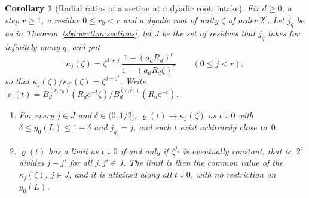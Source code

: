 \documentclass[11pt,a4paper]{article}
\newtheorem{corollary}[theorem]{Corollary}
\theoremstyle{definition}
\newcommand{\e}{\mathrm e}
\begin{document}
\begin{corollary}[Radial ratios of a section at a dyadic root; intake]
\label{sbd:wr:cor:ratio}
Fix $d\ge0$, a step $r\ge1$, a residue $0\le r_0<r$ and a dyadic root of
unity $\zeta$ of order $2^e$. Let $j_q$ be as in
Theorem~\ref{sbd:wr:thm:sections}, let $J$ be the set of residues that
$j_q$ takes for infinitely many $q$, and put
\[
 \kappa_j(\zeta)=\zeta^{1+j}\,\frac{1-(a_dR_d)^r}{1-(a_dR_d\zeta)^r}
 \qquad(0\le j<r),
\]
so that $\kappa_j(\zeta)/\kappa_{j'}(\zeta)=\zeta^{j-j'}$. Write
$\varrho(t)=B_d^{(r,r_0)}(R_d\e^{-t}\zeta)/B_d^{(r,r_0)}(R_d\e^{-t})$.
\begin{enumerate}[label=(\roman*)]
\item For every $j\in J$ and $\delta\in(0,1/2]$, $\varrho(t)\to\kappa_j(\zeta)$
as $t\downarrow0$ with $\delta\le y_0(L)\le1-\delta$ and $j_{q_t}=j$, and
such $t$ exist arbitrarily close to~$0$.
\item $\varrho(t)$ has a limit as $t\downarrow0$ if and only if
$\zeta^{j_q}$ is eventually constant, that is, $2^e$ divides $j-j'$ for all
$j,j'\in J$. The limit is then the common value of the $\kappa_j(\zeta)$,
$j\in J$, and it is attained along all $t\downarrow0$, with no restriction
on $y_0(L)$.
\end{enumerate}
\end{corollary}
\end{document}
